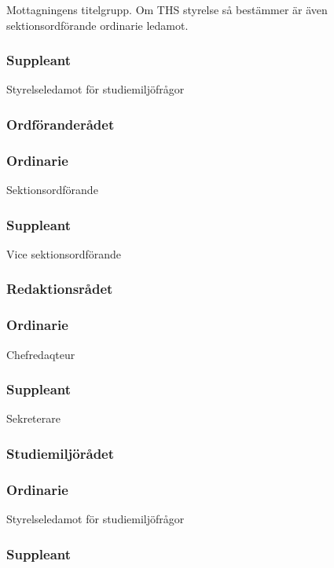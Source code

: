 \documentclass[a4paper,12pt]{article}
\begin{document}
Mottagningens titelgrupp. Om THS styrelse så bestämmer är även sektionsordförande ordinarie ledamot.

\subsubsection{Suppleant}

Styrelseledamot för studiemiljöfrågor

\subsubsection{Ordföranderådet}

\subsubsection{Ordinarie}

Sektionsordförande

\subsubsection{Suppleant}

Vice sektionsordförande

\subsubsection{Redaktionsrådet}

\subsubsection{Ordinarie}

Chefredaqteur

\subsubsection{Suppleant}

Sekreterare

\subsubsection{Studiemiljörådet}

\subsubsection{Ordinarie}

Styrelseledamot för studiemiljöfrågor

\subsubsection{Suppleant}
\end{document}
